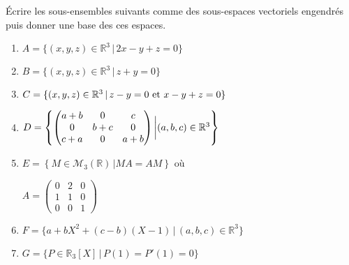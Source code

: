 \documentclass[a4paper,10pt]{report}
\begin{document}
\begin{Exercice}{} Écrire les sous-ensembles suivants comme des sous-espaces vectoriels engendrés puis donner une base des ces espaces. 

\begin{multicols}{2}
\begin{enumerate}
\item $A=\lbrace (x,y,z) \in \mathbb{R}^3 \, \vert  \, 2x-y+z=0 \rbrace$
\item $B= \lbrace (x,y,z) \in \mathbb{R}^3 \, \vert \, z+y=0 \rbrace$
\item $C= \lbrace (x,y,z) \in \mathbb{R}^3 \, \vert \, z-y=0 \hbox{ et } x-y+z=0 \rbrace$

\item $D = \left\lbrace \begin{pmatrix}
a+b & 0 & c \\
0 & b+c & 0 \\
c+a & 0& a+b 
\end{pmatrix} \bigg{\vert} (a,b,c) \in \mathbb{R}^3 \right\rbrace$

\columnbreak
\item $E = \left\lbrace M \in \mathcal{M}_3(\mathbb{R}) \,\vert  MA=AM \right\rbrace$ où \newline \begin{center}
$A = \begin{pmatrix}
0 & 2 & 0 \\
1 & 1 & 0 \\
0 & 0 & 1 
\end{pmatrix}$
\end{center}
\item $F= \lbrace a + bX^2 + (c-b)(X-1) \, \vert \, (a,b,c) \in \mathbb{R}^3 \rbrace$
\item $G = \lbrace P \in \mathbb{R}_3[X] \, \vert \,  P(1)=P'(1)=0 \rbrace$
\end{enumerate}
\end{multicols}

\vspace{0.05cm}
\end{Exercice}

\corr 
\end{document}
